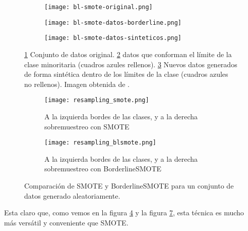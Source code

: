 \begin{figure}[H]
    \centering
    \begin{subfigure}[b]{0.33\textwidth}
		  \texttt{[image: bl-smote-original.png]}
        \caption{}
        \label{fig:blSMOTE-orig}
    \end{subfigure}
    \begin{subfigure}[b]{0.33\textwidth}
        \texttt{[image: bl-smote-datos-borderline.png]}
        \caption{}
        \label{fig:blSMOTE-border}
    \end{subfigure}
    \begin{subfigure}[b]{0.33\textwidth}
        \texttt{[image: bl-smote-datos-sinteticos.png]}
        \caption{}
        \label{fig:blSMOTE-sintetico}
    \end{subfigure}

    \caption{\ref{fig:blSMOTE-orig} Conjunto de datos original. \ref{fig:blSMOTE-border} datos que conforman el límite de la clase minoritaria (cuadros azules rellenos). \ref{fig:blSMOTE-sintetico} Nuevos datos generados de forma sintética dentro de los límites de la clase (cuadros azules no rellenos). Imagen obtenida de \cite{BL-SMOTE}.}
	 \label{fig:ejemploBL-SMOTE}

\end{figure}


\begin{figure}[H]
    \centering
	 \begin{subfigure}[b]{\textwidth}
		 \centering
		 \texttt{[image: resampling\_smote.png]}
		 \caption{A la izquierda bordes de las clases, y a la derecha sobremuestreo con SMOTE}
		 \label{fig:SMOTE-cmp}
	 \end{subfigure}

    \begin{subfigure}[b]{\textwidth}
		 \centering
		  \texttt{[image: resampling\_blsmote.png]}
        \caption{A la izquierda bordes de las clases, y a la derecha sobremuestreo con BorderlineSMOTE}
        \label{fig:BLSMOTE-cmp}
    \end{subfigure}

    \caption{Comparación de SMOTE y BorderlineSMOTE para un conjunto de datos generado aleatoriamente.}\label{fig:BLSMOTE-SMOTE}

\end{figure}

Esta claro que, como vemos en la figura \ref{fig:ejemploBL-SMOTE} y la figura \ref{fig:BLSMOTE-SMOTE}, esta técnica es mucho más versátil y conveniente que SMOTE.


